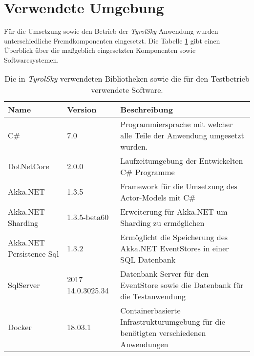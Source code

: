 \section{Verwendete Umgebung}
Für die Umsetzung sowie den Betrieb der \textit{TyrolSky} Anwendung wurden unterschiedliche Fremdkomponenten eingesetzt. Die Tabelle \ref{tab:implementation:EnvironmentVersions} gibt einen Überblick über die maßgeblich eingesetzten Komponenten sowie Softwaresystemen. 

\begin{table}[h]
  \centering
  \begin{tabular}{llp{6.5cm}}
  Name      & Version    & Beschreibung \\ \hline
  C\#     & 7.0        & Programmiersprache mit welcher alle Teile der Anwendung umgesetzt wurden. \\
  DotNetCore   & 2.0.0       & Laufzeitumgebung der Entwickelten C\# Programme \\
  Akka.NET    & 1.3.5       & Framework für die Umsetzung des  Actor-Models mit C\# \\
  Akka.NET Sharding & 1.3.5-beta60  & Erweiterung für Akka.NET um Sharding zu ermöglichen \\
  Akka.NET Persistence Sql & 1.3.2  & Ermöglicht die Speicherung des Akka.NET EventStores in einer SQL Datenbank\\
  SqlServer    & 2017 14.0.3025.34 & Datenbank Server für den EventStore sowie die Datenbank für die Testanwendung\\
  Docker     & 18.03.1      & Containerbasierte Infrastrukturumgebung für die benötigten verschiedenen Anwendungen\\
    \end{tabular}
    \caption{Die in \textit{TyrolSky} verwendeten Bibliotheken sowie die für den Testbetrieb verwendete Software.}
    \label{tab:implementation:EnvironmentVersions}
    \end{table}